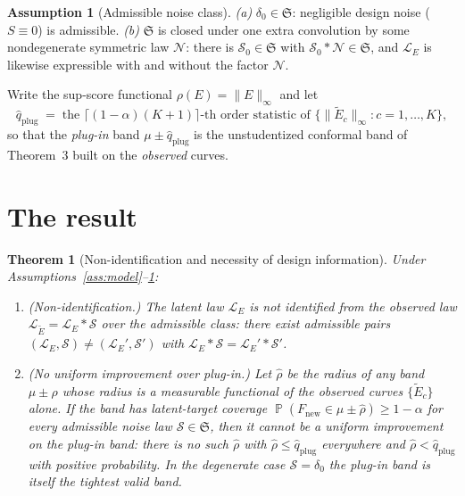 \documentclass[12pt]{article}
\newtheorem{theorem}{Theorem}
\theoremstyle{definition}
\newtheorem{assumption}{Assumption}
\theoremstyle{remark}
\newcommand{\Fnew}{F_{\mathrm{new}}}
\newcommand{\law}{\mathcal L}
\newcommand{\normi}[1]{\lVert #1\rVert_\infty}
\DeclareMathOperator{\Prob}{\mathbb P}
\begin{document}
\begin{assumption}[Admissible noise class]\label{ass:class}
\emph{(a)} $\delta_0\in\mathfrak S$: negligible design noise ($S\equiv0$) is admissible.
\emph{(b)} $\mathfrak S$ is closed under one extra convolution by some nondegenerate
symmetric law $\mathcal N$: there is $\mathcal S_0\in\mathfrak S$ with
$\mathcal S_0*\mathcal N\in\mathfrak S$, and $\law_E$ is likewise expressible with and without
the factor $\mathcal N$.
\end{assumption}

Write the sup-score functional $\rho(E)=\normi{E}$ and let
\[
  \widehat q_{\mathrm{plug}} \;=\; \text{the }\big\lceil(1-\alpha)(K+1)\big\rceil\text{-th
  order statistic of } \{\normi{\widetilde E_c}:c=1,\dots,K\},
\]
so that the \emph{plug-in} band $\mu\pm\widehat q_{\mathrm{plug}}$ is the unstudentized
conformal band of Theorem~3 built on the \emph{observed} curves.

\section*{The result}

\begin{theorem}[Non-identification and necessity of design information]\label{thm:impossible}
Under Assumptions~\ref{ass:model}--\ref{ass:class}:
\begin{enumerate}
\item[(i)] \emph{(Non-identification.)} The latent law $\law_E$ is not identified from the
observed law $\law_{\widetilde E}=\law_E*\mathcal S$ over the admissible class: there exist
admissible pairs $(\law_E,\mathcal S)\ne(\law_E',\mathcal S')$ with
$\law_E*\mathcal S=\law_E'*\mathcal S'$.
\item[(ii)] \emph{(No uniform improvement over plug-in.)} Let $\widehat\rho$ be the radius of
any band $\mu\pm\widehat\rho$ whose radius is a measurable functional of the observed curves
$\{\widetilde E_c\}$ alone. If the band has latent-target coverage
$\Prob(\Fnew\in\mu\pm\widehat\rho)\ge1-\alpha$ for \emph{every} admissible noise law
$\mathcal S\in\mathfrak S$, then it cannot be a uniform improvement on the plug-in band:
there is no such $\widehat\rho$ with $\widehat\rho\le\widehat q_{\mathrm{plug}}$ everywhere and
$\widehat\rho<\widehat q_{\mathrm{plug}}$ with positive probability. In the degenerate case
$\mathcal S=\delta_0$ the plug-in band is itself the tightest valid band.
\end{enumerate}
\end{theorem}
\end{document}

